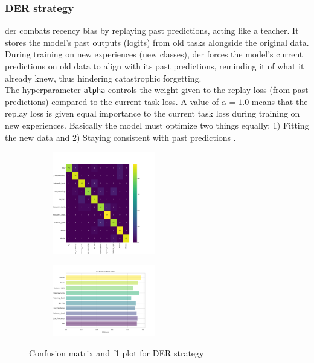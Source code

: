 \subsubsection{DER strategy}
\label{subsubsec:RQ1_DER}
\acrfull{der} combats recency bias by replaying past predictions, acting like a teacher. It stores the model's past outputs (logits) from old tasks alongside the original data. During training on new experiences (new classes), \acrshort{der} forces the model's current predictions on old data to align with its past predictions, reminding it of what it already knew, thus hindering catastrophic forgetting. \\
The hyperparameter \verb|alpha| controls the weight given to the replay loss (from past predictions) compared to the current task loss. A value of $\alpha = 1.0$ means that the replay loss is given equal importance to the current task loss during training on new experiences. Basically the model must optimize two things equally: 1) Fitting the new data and 2) Staying consistent with past predictions \citep{buzzega2020dark}.
\begin{figure}[H]
\centering
\begin{subfigure}
  \centering
  \includegraphics[width=0.49\textwidth]{Images/cm_DER_MultiView_100epochs.png}  
  \label{fig:sub-first}
\end{subfigure}
\begin{subfigure}
  \centering
  \includegraphics[width=0.49\textwidth]{Images/f1_DER_MultiView_100epochs.png}  
  \label{fig:sub-second}
\end{subfigure}
\caption{Confusion matrix and f1 plot for DER strategy}
\label{fig:cm_f1_der_baseline}
\end{figure}

